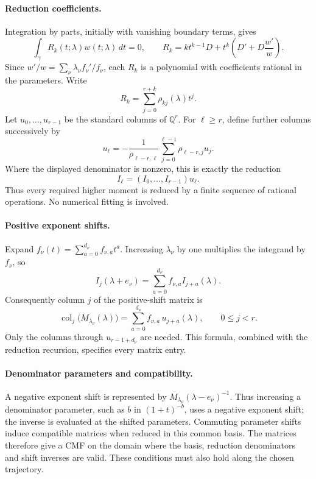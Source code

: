 \documentclass[oneside,english,11pt]{amsart}
\begin{document}
\smallskip
\paragraph{\textbf{Reduction coefficients.}}
Integration by parts, initially with vanishing boundary terms, gives
\[
 \int_\gamma R_k(t;\lambda)w(t;\lambda)\,dt=0,
 \qquad
 R_k=kt^{k-1}D+t^k\left(D'+D\frac{w'}w\right).
\]
Since $w'/w=\sum_\nu\lambda_\nu f_\nu'/f_\nu$, each $R_k$ is a
polynomial with coefficients rational in the parameters. Write
\[
 R_k=\sum_{j=0}^{r+k}\rho_{kj}(\lambda)t^j.
\]
Let $u_0,\ldots,u_{r-1}$ be the standard columns of $\mathbb Q^r$.
For $\ell\geq r$, define further columns successively by
\[
 u_\ell=-\frac{1}{\rho_{\ell-r,\ell}}
       \sum_{j=0}^{\ell-1}\rho_{\ell-r,j}u_j.
\]
Where the displayed denominator is nonzero, this is exactly the reduction
\[
 I_\ell=(I_0,\ldots,I_{r-1})u_\ell.
\]
Thus every required higher moment is reduced by a finite sequence of
rational operations. No numerical fitting is involved.

\smallskip
\paragraph{\textbf{Positive exponent shifts.}}
Expand $f_\nu(t)=\sum_{a=0}^{d_\nu}f_{\nu,a}t^a$. Increasing
$\lambda_\nu$ by one multiplies the integrand by $f_\nu$, so
\[
 I_j(\lambda+e_\nu)
 =\sum_{a=0}^{d_\nu}f_{\nu,a}I_{j+a}(\lambda).
\]
Consequently column $j$ of the positive-shift matrix is
\[
\operatorname{col}_j\!\bigl(M_{\lambda_\nu}(\lambda)\bigr)
=\sum_{a=0}^{d_\nu} f_{\nu,a}\,u_{j+a}(\lambda),
\qquad 0\leq j<r.
\]
Only the columns through $u_{r-1+d_\nu}$ are needed. This formula,
combined with the reduction recursion, specifies every matrix entry.

\smallskip
\paragraph{\textbf{Denominator parameters and compatibility.}}
A negative exponent shift is represented by
$M_{\lambda_\nu}(\lambda-e_\nu)^{-1}$. Thus increasing a denominator
parameter, such as $b$ in $(1+t)^{-b}$, uses a negative exponent shift;
the inverse is evaluated at the shifted parameters.
Commuting parameter shifts induce compatible matrices when reduced in
this common basis. The matrices therefore give a CMF on the domain
where the basis, reduction denominators and shift inverses are valid.
These conditions must also hold along the chosen trajectory.
\end{document}

